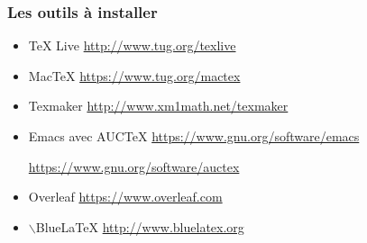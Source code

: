 
\begin{frame}[fragile]
  \frametitle{Les outils à installer}



  \begin{itemize}
  \item \TeX{} Live \hfill \url{http://www.tug.org/texlive}
  \item Mac\TeX{} \hfill \url{https://www.tug.org/mactex}
  \end{itemize}
  
  \pause


  \begin{itemize}
  \item Texmaker \hfill \url{http://www.xm1math.net/texmaker}
    
  \item Emacs avec AUC\TeX{} \hfill \url{https://www.gnu.org/software/emacs}
    
    \hfill \url{https://www.gnu.org/software/auctex}
    
  \end{itemize}
    
  \pause
  

  \begin{itemize}
  \item Overleaf \hfill \url{https://www.overleaf.com}
  \item $\backslash{}$BlueLaTeX \hfill \url{http://www.bluelatex.org}
  \end{itemize}
\end{frame}


